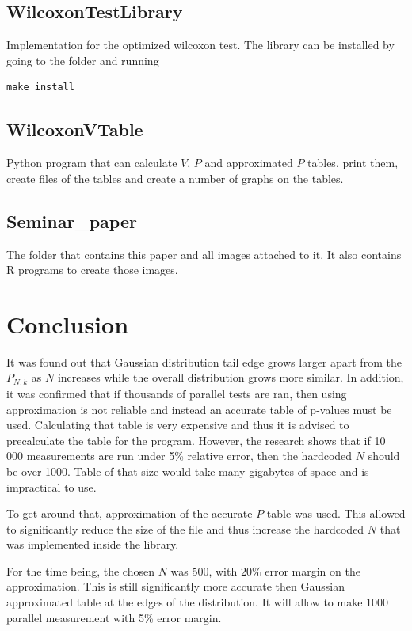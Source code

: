 \documentclass[12pt]{article}
\begin{document}
\subsection{WilcoxonTestLibrary}
Implementation for the optimized wilcoxon test. The library can be installed by going to the folder and running

\begin{lstlisting}
make install
\end{lstlisting}

\subsection{WilcoxonVTable}
Python program that can calculate $V$, $P$ and approximated $P$ tables, print them, create files of the tables and create a number of graphs on the tables.

\subsection{Seminar\_paper}
The folder that contains this paper and all images attached to it. It also contains R programs to create those images.

\newpage

\section{Conclusion}
It was found out that Gaussian distribution tail edge grows larger apart from the $P_{N, k}$ as $N$ increases while the overall distribution grows more similar. In addition, it was confirmed that if thousands of parallel tests are ran, then using approximation is not reliable and instead an accurate table of p-values must be used. Calculating that table is very expensive and thus it is advised to precalculate the table for the program. However, the research shows that if 10 000 measurements are run under 5\% relative error, then the hardcoded $N$ should be over 1000. Table of that size would take many gigabytes of space and is impractical to use.

To get around that, approximation of the accurate $P$ table was used. This allowed to significantly reduce the size of the file and thus increase the hardcoded $N$ that was implemented inside the library.

For the time being, the chosen $N$ was 500, with $20\%$ error margin on the approximation. This is still significantly more accurate then Gaussian approximated table at the edges of the distribution. It will allow to make 1000 parallel measurement with 5\% error margin.
\end{document}

